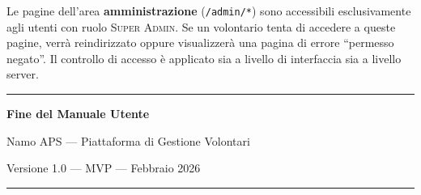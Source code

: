 \documentclass[a4paper,11pt,oneside]{book}
\newcommand{\percorso}[1]{\textcolor{namoCyan}{\texttt{#1}}}
\newcommand{\ruolo}[1]{\textsc{#1}}
\begin{document}
\begin{infobox}
Le pagine dell'area \textbf{amministrazione} (\percorso{/admin/*}) sono accessibili esclusivamente agli utenti con ruolo \ruolo{Super Admin}. Se un volontario tenta di accedere a queste pagine, verr\`a reindirizzato oppure visualizzer\`a una pagina di errore ``permesso negato''. Il controllo di accesso \`e applicato sia a livello di interfaccia sia a livello server.
\end{infobox}

\vspace{2cm}

\begin{center}
\textcolor{namoCyan}{\rule{0.4\textwidth}{1pt}}

\vspace{1cm}

{\large\textcolor{namoCharcoal}{\textbf{Fine del Manuale Utente}}}

\vspace{0.5cm}

{\normalsize\textcolor{namoCharcoal}{Namo APS --- Piattaforma di Gestione Volontari}}

\vspace{0.3cm}

{\small\textcolor{namoCharcoal}{Versione 1.0 --- MVP --- Febbraio 2026}}

\vspace{1cm}

\textcolor{namoCyan}{\rule{0.4\textwidth}{1pt}}
\end{center}
\end{document}
